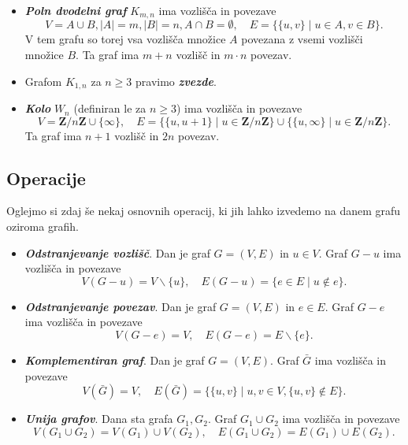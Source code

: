 \documentclass[11pt]{book}
\def\ZZ{\mathbf{Z}}
\def\definicija{\color{rdeca}\bf\em}
\theoremstyle{definition}
\theoremstyle{zgled}
\theoremstyle{odprtproblem}
\theoremstyle{domacanaloga}
\theoremstyle{izrek}
\begin{document}
\begin{itemize}
    \item {\definicija Poln dvodelni graf} $K_{m,n}$ ima vozlišča in povezave
\[
    V = A \cup B, |A| = m, |B|=n, A \cap B = \emptyset, \quad
    E = \{ \{ u,v\} \mid u \in A, v \in B \}.
\]
V tem grafu so torej vsa vozlišča množice $A$ povezana z vsemi vozlišči množice $B$. Ta graf ima $m+n$ vozlišč in $m \cdot n$ povezav. 

    \item Grafom $K_{1,n}$ za $n \geq 3$ pravimo {\definicija zvezde}.

    \item {\definicija Kolo} $W_n$ (definiran le za $n \geq 3$) ima vozlišča in povezave
\[
    V = \ZZ/n\ZZ \cup \{ \infty \}, \quad
    E = \{ \{ u, u+1 \} \mid u \in \ZZ/n\ZZ \} \cup \{ \{ u, \infty \} \mid u \in \ZZ/n\ZZ \}.
\]
Ta graf ima $n+1$ vozlišč in $2n$ povezav.
\end{itemize}

\subsection{Operacije}

Oglejmo si zdaj še nekaj osnovnih operacij, ki jih lahko izvedemo na danem grafu oziroma grafih.

\begin{itemize}
    \item {\definicija Odstranjevanje vozlišč}. Dan je graf $G = (V,E)$ in $u \in V$. Graf $G - u$ ima vozlišča in povezave
    \[
        V(G - u) = V \backslash \{ u \}, \quad
        E(G - u) = \{ e \in E \mid u \notin e \}.
    \]

    \item {\definicija Odstranjevanje povezav}. Dan je graf $G = (V,E)$ in $e \in E$. Graf $G - e$ ima vozlišča in povezave
    \[
        V(G - e) = V, \quad
        E(G - e) = E \backslash \{ e \}.   
    \]

    \item {\definicija Komplementiran graf}. Dan je graf $G = (V,E)$. Graf $\bar G$ ima vozlišča in povezave
    \[
        V(\bar G) = V, \quad
        E(\bar G) = \{ \{ u,v \} \mid u,v \in V, \{ u,v \} \notin E \}.
    \]

    \item {\definicija Unija grafov}. Dana sta grafa $G_1, G_2$. Graf $G_1 \cup G_2$ ima vozlišča in povezave
    \[
        V(G_1 \cup G_2) = V(G_1) \cup V(G_2), \quad 
        E(G_1 \cup G_2) = E(G_1) \cup E(G_2).
    \]
\end{itemize}
\end{document}
